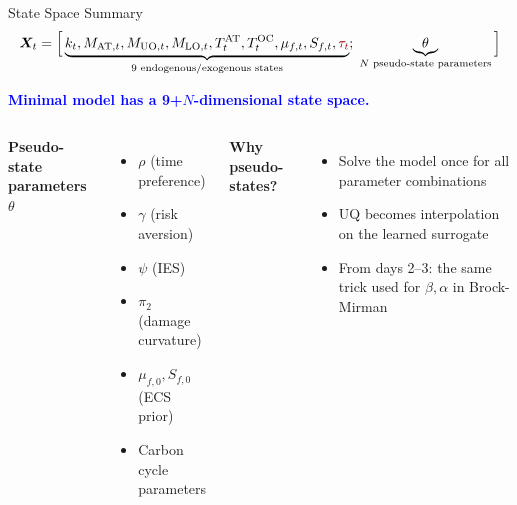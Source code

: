 \documentclass[aspectratio=169,11pt]{beamer}
\newcommand{\emphc}[1]{\textcolor{harvardcrimson}{#1}}
\newcommand{\X}{\bm{X}}
\begin{document}
\begin{frame}{State Space Summary}
\[
\X_t = \Big[\underbrace{k_t, M_{\mathrm{AT},t}, M_{\mathrm{UO},t}, M_{\mathrm{LO},t}, T^{\mathrm{AT}}_t, T^{\mathrm{OC}}_t, \mu_{f,t}, S_{f,t}, \emphc{\tau_t}}_{\text{9 endogenous/exogenous states}};\; \underbrace{\theta}_{\text{$N$ pseudo-state parameters}}\Big]
\]

\vspace{0.2cm}
\begin{center}
\textcolor{blue}{\textbf{Minimal model has a 9+$N$-dimensional state space.}}
\end{center}

\vspace{0.2cm}
\begin{columns}[T]
\textbf{Pseudo-state parameters $\theta$}
\begin{itemize}
    \item $\rho$ (time preference)
    \item $\gamma$ (risk aversion)
    \item $\psi$ (IES)
    \item $\pi_2$ (damage curvature)
    \item $\mu_{f,0}, S_{f,0}$ (ECS prior)
    \item Carbon cycle parameters
\end{itemize}

\textbf{Why pseudo-states?}
\begin{itemize}
    \item Solve the model \emphc{once} for all parameter combinations
    \item UQ becomes interpolation on the learned surrogate
    \item From days 2--3: the same trick used for $\beta, \alpha$ in Brock-Mirman
\end{itemize}
\end{columns}
\end{frame}
\end{document}
